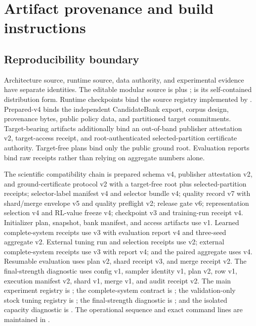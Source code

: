 \section{Artifact provenance and build instructions}\label{app:provenance}
\subsection{Reproducibility boundary}
Architecture source, runtime source, data authority, and experimental evidence have separate identities. The editable modular source is  plus ;  is its self-contained distribution form. Runtime checkpoints bind the source registry implemented by . Prepared-v4 binds the independent CandidateBank export, corpus design, provenance bytes, public policy data, and partitioned target commitments. Target-bearing artifacts additionally bind an out-of-band publisher attestation v2, target-access receipt, and root-authenticated selected-partition certificate authority. Target-free plans bind only the public ground root. Evaluation reports bind raw receipts rather than relying on aggregate numbers alone.

The scientific compatibility chain is prepared schema v4, publisher attestation v2, and ground-certificate protocol v2 with a target-free root plus selected-partition receipts; selector-label manifest v4 and selector bundle v4; quality record v7 with shard/merge envelope v5 and quality preflight v2; release gate v6; representation selection v4 and RL-value freeze v4; checkpoint v3 and training-run receipt v4. Initializer plan, snapshot, bank manifest, and access artifacts use v1. Learned complete-system receipts use v3 with evaluation report v4 and three-seed aggregate v2. External tuning run and selection receipts use v2; external complete-system receipts use v3 with report v4; and the paired aggregate uses v4. Resumable evaluation uses plan v2, shard receipt v3, and merge receipt v2. The final-strength diagnostic uses config v1, sampler identity v1, plan v2, row v1, execution manifest v2, shard v1, merge v1, and audit receipt v2. The main experiment registry is ; the complete-system contract is ; the validation-only stock tuning registry is ; the final-strength diagnostic is ; and the isolated capacity diagnostic is . The operational sequence and exact command lines are maintained in .

